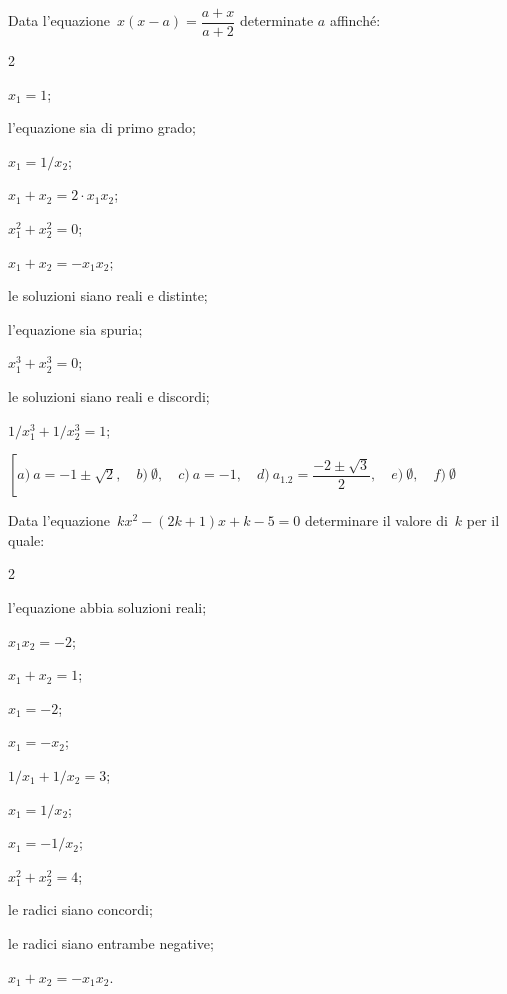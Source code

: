 \begin{esercizio}[*]
\label{ese:3.103}
Data l'equazione~\(x (x-a) = \dfrac{a + x}{a + 2}\) determinate \(a\) 
affinché:
\begin{htmulticols}{2}
\begin{enumeratea}
\item \(x_1 = 1\);
\item l'equazione sia di primo grado;
\item \(x_1 = 1 / x_2\);
\item \(x_1 + x_2 = 2 \cdot x_1 x_2\);
\item \(x_1^2 + x_2^2 = 0\);
\item \(x_1 + x_2 = - x_1 x_2\);
\item le soluzioni siano reali e distinte;
\item l'equazione sia spuria;
\item \(x_1^3 + x_2^3 = 0\);
\item le soluzioni siano reali e discordi;
\item \(1/x_1^3 + 1/x_2^3 = 1\);
\end{enumeratea}
\end{htmulticols}
\end{esercizio}

\begin{flushright}
{\small
\(\left[
a)~ a =-1 \pm \sqrt{2} ,\quad 
b)~ \emptyset ,\quad 
c)~ a =-1 ,\quad 
d)~ a_{1.2} =\dfrac{- 2 \pm \sqrt{3}}{2} ,\quad 
e)~ \emptyset ,\quad 
f)~ \emptyset \right.\)
}
\end{flushright}

\begin{esercizio}[*]
\label{ese:3.104}
Data l'equazione~\(kx^{2}-(2k + 1) x + k-5 = 0\) determinare il valore 
di~\(k\) 
per 
il quale:
\begin{htmulticols}{2}
\begin{enumeratea}
\item l'equazione abbia soluzioni reali;
\item \(x_1 x_2=-2\);
\item \(x_1 + x_2 = 1\);
\item \(x_1 = -2\);
\item \(x_1 = -x_2\);
\item \(1/x_1 + 1/x_2 = 3\);
\item \(x_1 = 1/x_2\);
\item \(x_1 = -1/x_2\);
\item \(x_1^2 + x_2^2 = 4\);
\item le radici siano concordi;
\item le radici siano entrambe negative;
\item \(x_1 + x_2 = - x_1 x_2\).
\end{enumeratea}
\end{htmulticols}
\end{esercizio}

